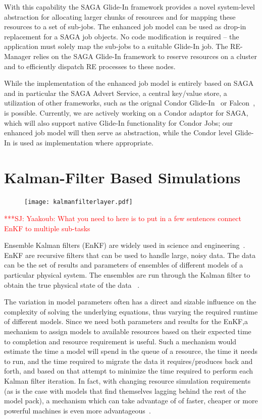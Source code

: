 \documentclass[conference,final]{IEEEtran}
\newcommand{\jhanote}[1]{ {\textcolor{red} { ***SJ: #1 }}}
\newcommand{\jhanote}[1]{}
\begin{document}
With this capability the SAGA Glide-In framework provides a novel system-level 
abstraction for allocating larger chunks of resources 
and for mapping these resources to a set of sub-jobs. The enhanced job model can 
be used as drop-in replacement for a SAGA job objects. No code modification is required
-- the application must solely map the sub-jobs to a suitable Glide-In job.
The RE-Manager relies on the SAGA Glide-In framework to reserve resources on a cluster
and to efficiently dispatch RE processes to these nodes.

While the implementation of the enhanced job model is entirely based
on SAGA and in particular the SAGA Advert Service, a central key/value
store, a utilization of other frameworks, such as the orignal Condor
Glide-In~\cite{citeulike:291860} or Falcon~\cite{1362680}, is
possible. Currently, we are actively working on a Condor adaptor for
SAGA, which will also support native Glide-In functionality for Condor
Jobs; our enhanced job model will then serve as abstraction, while the
Condor level Glide-In is used as implementation where appropriate.

\section{Kalman-Filter Based Simulations}

\begin{figure}[htbp]
    \centering
    \texttt{[image: kalmanfilterlayer.pdf]}
    \caption{}
    \label{fig:remdmanager_v11}
\end{figure}  

\jhanote{Yaakoub: What you need to here is to put in a few sentences
  connect EnKF to multiple sub-tasks}

Ensemble Kalman filters (EnKF) are widely used in science and
engineering~\cite{DataAssim, KalmanPaper, LiEnKF07, DO2007, DO2006}.
EnKF are recursive filters that can be used to handle large, noisy
data. The data can be the set of results and parameters of ensembles
of different models of a particular physical system. The ensembles are
run through the Kalman filter to obtain the true physical state of the
data ~\cite{DataAssim,KalmanPaper}.

The variation in model parameters often has a direct and sizable
influence on the complexity of solving the underlying equations, thus
varying the required runtime of different models. Since we need both
parameters and results for the EnKF,a mechanism to assign models to
available resources based on their expected time to completion and
resource requirement is useful.  Such a mechanism would estimate the
time a model will spend in the queue of a resource, the time it needs
to run, and the time required to migrate the data it requires/produces
back and forth, and based on that attempt to minimize the time
required to perform each Kalman filter iteration.  In fact, with
changing resource simulation requirements (as is the case with models
that find themselves lagging behind the rest of the model pack), a
mechanism which can take advantage of of faster, cheaper or more
powerful machines is even more advantageous~\cite{escience07}.
\end{document}
